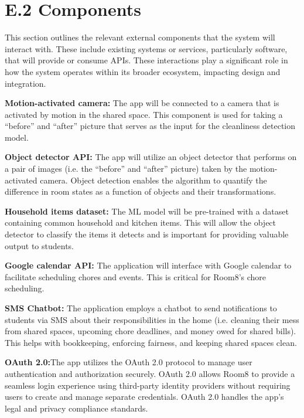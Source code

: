 \documentclass{scrreprt}
\newcommand*{\nsection}[1]{
    \section*{#1}
    \addcontentsline{toc}{section}{#1}
}
\theoremstyle{definition}
\begin{document}
\nsection{E.2 Components}
This section outlines the relevant external components that the system will interact with. These include existing systems or services, particularly software, that will provide or consume APIs. These interactions play a significant role in how the system operates within its broader ecosystem, impacting design and integration.
\begin{flushleft}
  \item \textbf{Motion-activated camera:} The app will be connected to a camera that is activated by motion in the shared space. This component is used for taking a “before” and “after” picture that serves as the input for the cleanliness detection model. \newline
  
  \item \textbf{Object detector API:} The app will utilize an object detector that performs on a pair of images (i.e. the “before” and “after” picture) taken by the motion-activated camera. Object detection enables the algorithm to quantify the difference in room states as a function of objects and their transformations.\newline 
  
  \item \textbf{Household items dataset:} The ML model will be pre-trained with a dataset containing common household and kitchen items. This will allow the object detector to classify the items it detects and is important for providing valuable output to students.\newline
   
  \item \textbf{Google calendar API:} The application will interface with Google calendar to facilitate scheduling chores and events. This is critical for Room8's chore scheduling.\newline

  \item \textbf{SMS Chatbot:} The application employs a chatbot to send notifications to students via SMS about their responsibilities in the home (i.e. cleaning their mess from shared spaces, upcoming chore deadlines, and money owed for shared bills). This helps with bookkeeping, enforcing fairness, and keeping shared spaces clean.\newline

  \item \textbf{OAuth 2.0:}The app utilizes the OAuth 2.0 protocol to manage user authentication and authorization securely. OAuth 2.0 allows Room8 to provide a seamless login experience using third-party identity providers without requiring users to create and manage separate credentials. OAuth 2.0 handles the app’s legal and privacy compliance standards.\newline

\end{flushleft}
\end{document}
